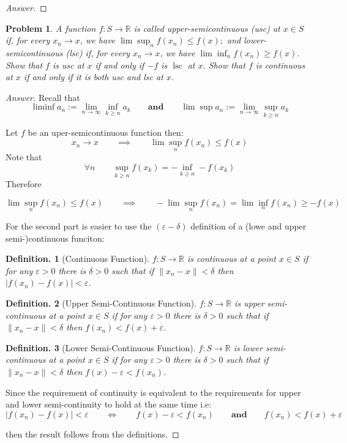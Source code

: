 \documentclass{article}
\newtheorem{defin}{Definition.}
\newtheorem{problem}{Problem}
\newcommand{\qiq}{\qquad \implies \qquad}
\newcommand{\qiffq}{\qquad \iff \qquad}
\newcommand{\qaq}{\qquad \textbf{and} \qquad}
\begin{document}
\begin{proof}[Answer]
    
\end{proof}

\begin{problem}
    A function $f: S \rightarrow \mathbb{R}$ is called upper-semicontinuous (usc) at $x \in S$ if, for every $x_{n} \rightarrow x$, we have $\lim \sup _{n} f\left(x_{n}\right) \leq f(x) ;$ and lower-semicontinuous (lsc) if, for every $x_{n} \rightarrow x$, we have $\lim \inf _{n} f\left(x_{n}\right) \geq f(x)$. Show that $f$ is usc at $x$ if and only if $-f$ is $\operatorname{lsc}$ at $x$. Show that $f$ is continuous at $x$ if and only if it is both usc and lsc at $x$. 
\end{problem}

\begin{proof}[Answer]
    Recall that
    $$\liminf a_{n}:=\lim _{n \rightarrow \infty} \inf _{k \geq n} a_{k} \qaq \lim \sup a_{n}:=\lim _{n \rightarrow \infty} \sup _{k \geq n} a_{k}$$

    Let $f$ be an uper-semicontinuous function then:
    $$x_n \to x \qiq   \lim \sup _{n} f\left(x_{n}\right) \leq f(x)$$
    Note that  $$\forall n \qquad  \sup_{k\geq n} f(x_k) = -\inf_{k\geq n} -f(x_k) $$
    Therefore
    
    $$\lim \sup _{n} f\left(x_{n}\right) \leq f(x) \qiq -\lim \sup _{n} f\left(x_{n}\right)= \lim \inf _{n} f\left(x_{n}\right)\geq -f(x)$$

    For the second part is easier to use the $(\varepsilon-\delta)$ definition of a (lowe and upper semi-)continuous funciton:

    \begin{defin}[Continuous Function]
        $f: S \rightarrow \mathbb{R}$ is continuous at a point $x\in S$ if for any $\varepsilon>0$ there is $\delta >0$ such that if $\|x_n - x\|<\delta$ then $|f(x_n)-f(x)|<\varepsilon$.
    \end{defin}

    \begin{defin}[Upper Semi-Continuous Function]
        $f: S \rightarrow \mathbb{R}$ is upper semi-continuous at a point $x\in S$ if for any $\varepsilon>0$ there is $\delta >0$ such that if $\|x_n - x\|<\delta$ then $f(x_n)<f(x)+\varepsilon$.
    \end{defin}
    
    \begin{defin}[Lower Semi-Continuous Function]
        $f: S \rightarrow \mathbb{R}$ is lower semi-continuous at a point $x\in S$ if for any $\varepsilon>0$ there is $\delta >0$ such that if $\|x_n - x\|<\delta$ then $f(x) - \varepsilon<f(x_n)$.
    \end{defin}

    Since the requirement of continuity is equivalent to the requirements for upper and lower semi-continuity to hold at the same time i.e:
    $$|f(x_n)-f(x)|<\varepsilon \qiffq f(x) -\varepsilon < f(x_n) \qaq f(x_n) < f(x) + \varepsilon$$

    then the result follows from the definitions.

\end{proof}
\end{document}
